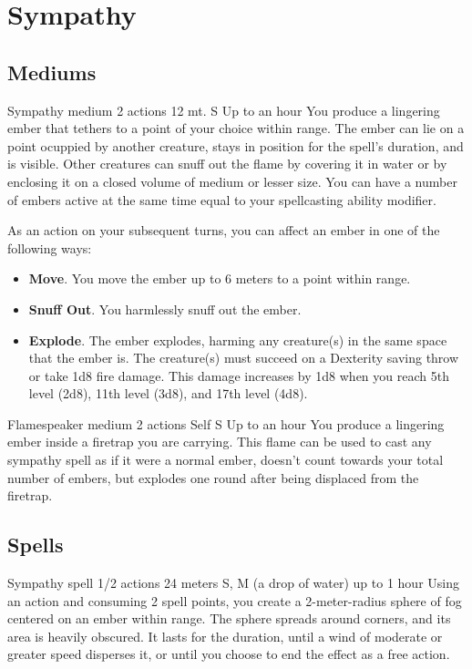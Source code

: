 \section{Sympathy}
\subsection*{Mediums}
        {Sympathy medium}
        {2 actions}
        {12 mt.}
        {S}
        {Up to an hour}
        You produce a lingering ember that tethers to a point of your choice within range.
        The ember can lie on a point ocuppied by another creature, stays in position for the spell's duration, and is visible.
        Other creatures can snuff out the flame by covering it in water or by enclosing it on a closed volume of medium or lesser size.
        You can have a number of embers active at the same time equal to your spellcasting ability modifier.

        As an action on your subsequent turns, you can affect an ember in one of the following ways:
        \begin{itemize}
            \item \textbf{Move}.
            You move the ember up to 6 meters to a point within range.
            \item \textbf{Snuff Out}.
            You harmlessly snuff out the ember.
            \item \textbf{Explode}.
            The ember explodes, harming any creature(s) in the same space that the ember is.
            The creature(s) must succeed on a Dexterity saving throw or take 1d8 fire damage.
            This damage increases by 1d8 when you reach 5th level (2d8), 11th level (3d8), and 17th level (4d8).
        \end{itemize}
        {Flamespeaker medium}
        {2 actions}
        {Self}
        {S}
        {Up to an hour}
        You produce a lingering ember inside a firetrap you are carrying.
        This flame can be used to cast any sympathy spell as if it were a normal ember, doesn't count towards your total number of embers, but explodes one round after being displaced from the firetrap.


\subsection*{Spells}
        {Sympathy spell}
        {1/2 actions}
        {24 meters}
        {S, M (a drop of water)}
        {up to 1 hour}
        Using an action and consuming 2 spell points, you create a 2-meter-radius sphere of fog centered on an ember within range.
        The sphere spreads around corners, and its area is heavily obscured.
        It lasts for the duration, until a wind of moderate or greater speed disperses it, or until you choose to end the effect as a free action.

